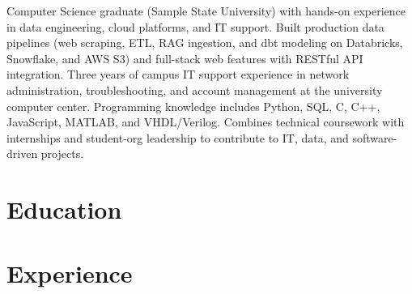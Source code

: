 \documentclass[10pt,a4paper]{article}
\begin{document}
\contactheader

Computer Science graduate (Sample State University) with hands-on experience in data engineering, cloud platforms, and IT support. Built production data pipelines (web scraping, ETL, RAG ingestion, and dbt modeling on Databricks, Snowflake, and AWS S3) and full-stack web features with RESTful API integration. Three years of campus IT support experience in network administration, troubleshooting, and account management at the university computer center. Programming knowledge includes Python, SQL, C, C++, JavaScript, MATLAB, and VHDL/Verilog. Combines technical coursework with internships and student-org leadership to contribute to IT, data, and software-driven projects.

\section*{Education}

\section*{Experience}
\end{document}
